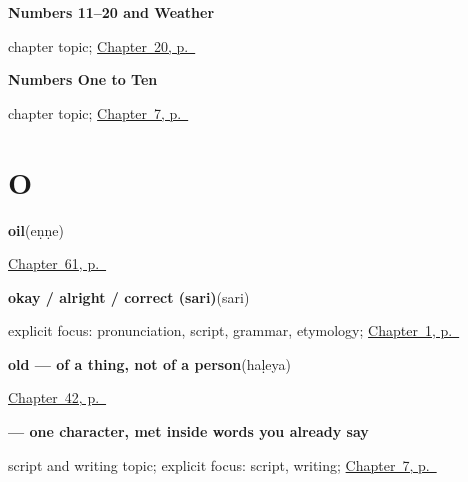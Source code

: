 \noindent\begin{minipage}[t]{\linewidth}
\raggedright
\textbf{Numbers 11–20 and Weather}\par
\footnotesize chapter topic; \hyperref[ch:ka-numbers-and-weather]{Chapter~20, p.~\pageref*{ch:ka-numbers-and-weather}}
\end{minipage}\par\smallskip

\noindent\begin{minipage}[t]{\linewidth}
\raggedright
\textbf{Numbers One to Ten}\par
\footnotesize chapter topic; \hyperref[ch:ka-numbers-one-to-ten]{Chapter~7, p.~\pageref*{ch:ka-numbers-one-to-ten}}
\end{minipage}\par\smallskip

\section*{O}

\noindent\begin{minipage}[t]{\linewidth}
\raggedright
\textbf{oil}\enspace\emph{}\enspace(eṇṇe)\par
\footnotesize \hyperref[ch:ka-kitchen]{Chapter~61, p.~\pageref*{ch:ka-kitchen}}
\end{minipage}\par\smallskip

\noindent\begin{minipage}[t]{\linewidth}
\raggedright
\textbf{okay / alright / correct (sari)}\enspace\emph{}\enspace(sari)\par
\footnotesize explicit focus: pronunciation, script, grammar, etymology; \hyperref[ch:greetings]{Chapter~1, p.~\pageref*{ch:greetings}}
\end{minipage}\par\smallskip

\noindent\begin{minipage}[t]{\linewidth}
\raggedright
\textbf{old — of a thing, not of a person}\enspace\emph{}\enspace(haḷeya)\par
\footnotesize \hyperref[ch:kn-describing-things]{Chapter~42, p.~\pageref*{ch:kn-describing-things}}
\end{minipage}\par\smallskip

\noindent\begin{minipage}[t]{\linewidth}
\raggedright
\textbf{ — one character, met inside words you already say}\par
\footnotesize script and writing topic; explicit focus: script, writing; \hyperref[ch:ka-numbers-one-to-ten]{Chapter~7, p.~\pageref*{ch:ka-numbers-one-to-ten}}
\end{minipage}\par\smallskip

